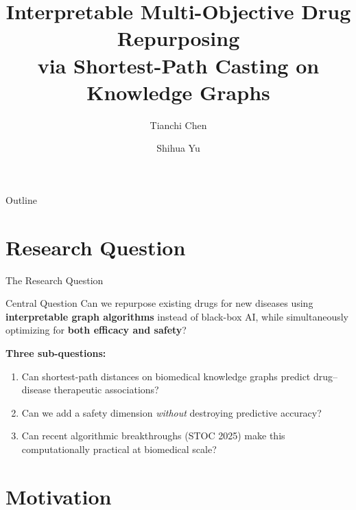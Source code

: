 \documentclass[aspectratio=169,11pt]{beamer}
\title{Interpretable Multi-Objective Drug Repurposing\\via Shortest-Path Casting on Knowledge Graphs}
\author{Tianchi Chen \and Shihua Yu}
\institute{
\texttt{github.com/youseihuayu-wonderful/OptimShortestPaths.jl}
}
\date{}
\begin{document}
\begin{frame}
\titlepage
\end{frame}

\begin{frame}{Outline}
\tableofcontents
\end{frame}

\section{Research Question}

\begin{frame}{The Research Question}

\begin{block}{Central Question}
\Large Can we repurpose existing drugs for new diseases using
\textbf{interpretable graph algorithms} instead of black-box AI,
while simultaneously optimizing for \textbf{both efficacy and safety}?
\end{block}

\vspace{1em}

\textbf{Three sub-questions:}

\begin{enumerate}
    \item Can shortest-path distances on biomedical knowledge graphs
          predict drug--disease therapeutic associations?
    \item Can we add a safety dimension \emph{without} destroying
          predictive accuracy?
    \item Can recent algorithmic breakthroughs (STOC 2025) make this
          computationally practical at biomedical scale?
\end{enumerate}

\end{frame}

\section{Motivation}
\end{document}
